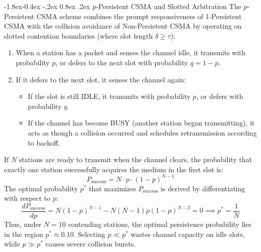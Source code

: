 \documentclass[11pt,a4paper]{article}
\makeatletter
\renewcommand\subsection{\@startsection{subsection}{2}{\z@}%
                                     {-1.8ex\@plus -0.4ex \@minus -.2ex}%
                                     {0.8ex \@plus .2ex}%
                                     {\normalfont\large\bfseries}}
\makeatother
\begin{document}
\subsection{\texorpdfstring{$p$-Persistent}{p-Persistent} CSMA and Slotted Arbitration}
The $p$-Persistent CSMA scheme combines the prompt responsiveness of 1-Persistent CSMA with the collision avoidance of Non-Persistent CSMA by operating on slotted contention boundaries (where slot length $\delta \ge \tau$):
\begin{enumerate}
    \item When a station has a packet and senses the channel idle, it transmits with probability $p$, or defers to the next slot with probability $q = 1 - p$.
    \item If it defers to the next slot, it senses the channel again:
    \begin{itemize}
        \item If the slot is still IDLE, it transmits with probability $p$, or defers with probability $q$.
        \item If the channel has become BUSY (another station began transmitting), it acts as though a collision occurred and schedules retransmission according to backoff.
    \end{itemize}
\end{enumerate}
If $N$ stations are ready to transmit when the channel clears, the probability that exactly one station successfully acquires the medium in the first slot is:
\begin{equation}
    P_{\text{success}} = N \cdot p \cdot (1 - p)^{N-1}
\end{equation}
The optimal probability $p^*$ that maximizes $P_{\text{success}}$ is derived by differentiating with respect to $p$:
\begin{equation}
    \frac{d P_{\text{success}}}{d p} = N(1-p)^{N-1} - N(N-1)p(1-p)^{N-2} = 0 \implies p^* = \frac{1}{N}
\end{equation}
Thus, under $N = 10$ contending stations, the optimal persistence probability lies in the region $p^* \approx 0.10$. Selecting $p \ll p^*$ wastes channel capacity on idle slots, while $p \gg p^*$ causes severe collision bursts.
\end{document}
